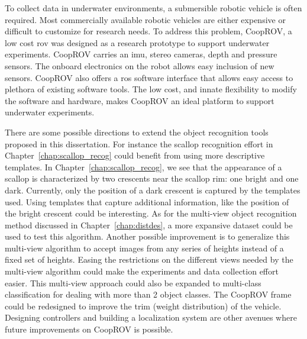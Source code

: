 To collect data in underwater environments, a submersible robotic vehicle is often required.
Most commercially available robotic vehicles are either expensive or difficult to customize for research needs. To address this problem, CoopROV, a low cost \gls{rov} was designed as a research prototype to support underwater experiments. CoopROV carries an \gls{imu}, stereo cameras, depth and pressure sensors. The onboard electronics on the robot allows easy inclusion of new sensors. CoopROV also offers a \gls{ros} software interface that allows easy access to plethora of existing software tools. The low cost, and innate flexibility to modify the software and hardware, makes CoopROV an ideal platform to support underwater experiments.

There are some possible directions to extend the object recognition tools proposed in this dissertation. For instance the scallop recognition effort in Chapter~\ref{chap:scallop_recog} could benefit from using more descriptive 
templates. In Chapter~\ref{chap:scallop_recog}, we see that the appearance of a scallop is characterized by two crescents near the scallop rim: one bright and one dark. Currently, only the position of a dark crescent is captured by the templates used. Using templates that capture additional information, like the position of the bright crescent could be interesting. As for the multi-view object recognition method discussed in Chapter~\ref{chap:distdes}, a more expansive dataset could be used to test this algorithm. Another possible improvement is to generalize this multi-view algorithm to accept images from any series of heights instead of a fixed set of heights. Easing the restrictions on the different views needed by the multi-view algorithm could make the experiments and data collection effort easier. This multi-view approach could also be expanded to multi-class classification for dealing with more than 2 object classes. The CoopROV frame could be redesigned to improve the trim (weight distribution) of 
the vehicle. Designing controllers and building a localization system are other avenues where future improvements on CoopROV is possible.

